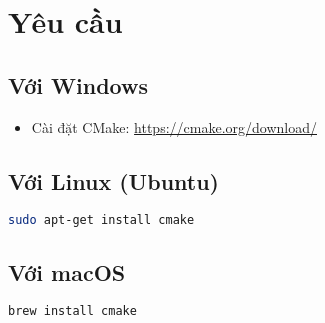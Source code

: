 \documentclass[11pt]{article}
\begin{document}
\section*{Yêu cầu}

\subsection*{Với Windows}
\begin{itemize}
    \item Cài đặt CMake: \url{https://cmake.org/download/}
\end{itemize}

\subsection*{Với Linux (Ubuntu)}
\begin{lstlisting}[language=bash]
sudo apt-get install cmake
\end{lstlisting}

\subsection*{Với macOS}
\begin{lstlisting}[language=bash]
brew install cmake
\end{lstlisting}

\end{document}
